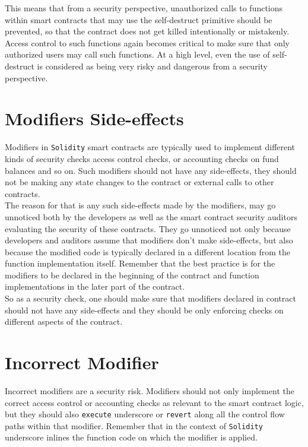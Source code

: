 This means that from a security perspective, unauthorized calls to functions within smart contracts that may use the self-destruct primitive should be prevented, so that the contract does not get killed intentionally or mistakenly.\\ 

Access control to such functions again becomes critical to make sure that only authorized users may call such functions. At a high level, even the use of self-destruct is considered as being very risky and dangerous from a security perspective.

\section{Modifiers Side-effects}

Modifiers in \texttt{Solidity} smart contracts are typically used to implement different kinds of security checks access control checks, or accounting checks on fund balances and so on. Such modifiers should not have any side-effects, they should not be making any state changes to the contract or external calls to other contracts.\\

The reason for that is any such side-effects made by the modifiers, may go unnoticed both by the developers as well as the smart contract security auditors evaluating the security of these contracts. They go unnoticed not only because developers and auditors assume that modifiers don't make side-effects, but also because the modified code is typically declared in a different location from the function implementation itself. Remember that the best practice is for the modifiers to be declared in the beginning of the contract and function implementations in the later part of the contract.\\ 

So as a security check, one should make sure that modifiers declared in contract should not have any side-effects and they should be only enforcing checks on different aspects of the contract.

\section{Incorrect Modifier}

Incorrect modifiers are a security risk. Modifiers should not only implement the correct access control or accounting checks as relevant to the smart contract logic, but they should also \texttt{execute} underscore or \texttt{revert} along all the control flow paths within that modifier. Remember that in the context of \texttt{Solidity} underscore inlines the function code on which the modifier is applied.\\

